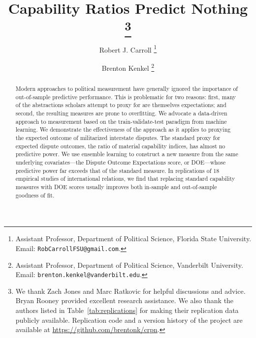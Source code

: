 \documentclass[11pt,oneside]{article}
\title{
  Capability Ratios Predict Nothing%
  \thanks{%
    We thank Zach Jones and Marc Ratkovic for helpful discussions and advice.
    Bryan Rooney provided excellent research assistance.
    We also thank the authors listed in Table~\ref{tab:replications} for making their replication data publicly available.
    Replication code and a version history of the project are available at \url{https://github.com/brentonk/crpn}.
  }%
}
\author{%
  Robert J. Carroll%
  \thanks{%
    Assistant Professor, Department of Political Science, Florida State University.  Email:  \nolinkurl{RobCarrollFSU@gmail.com}.
  }%
  \and%
  Brenton Kenkel%
  \thanks{
    Assistant Professor, Department of Political Science, Vanderbilt University.
    Email: \nolinkurl{brenton.kenkel@vanderbilt.edu}.
  }%
}
\begin{document}
\maketitle

\begin{abstract}
  Modern approaches to political measurement have generally ignored the importance of out-of-sample predictive performance. 
  This is problematic for two reasons: first, many of the abstractions scholars attempt to proxy for are themselves expectations; and second, the resulting measures are prone to overfitting.
  We advocate a data-driven approach to measurement based on the train-validate-test paradigm from machine learning. 
  We demonstrate the effectiveness of the approach as it applies to proxying the expected outcome of militarized interstate disputes. 
  The standard proxy for expected dispute outcomes, the ratio of material capability indices, has almost no predictive power.
  We use ensemble learning to construct a new measure from the same underlying covariates---the Dispute Outcome Expectations score, or DOE---whose predictive power far exceeds that of the standard measure.
  In replications of 18 empirical studies of international relations, we find that replacing standard capability measures with DOE scores usually improves both in-sample and out-of-sample goodness of fit.
\end{abstract}

\clearpage























\clearpage
\appendix


\newpage


\end{document}
